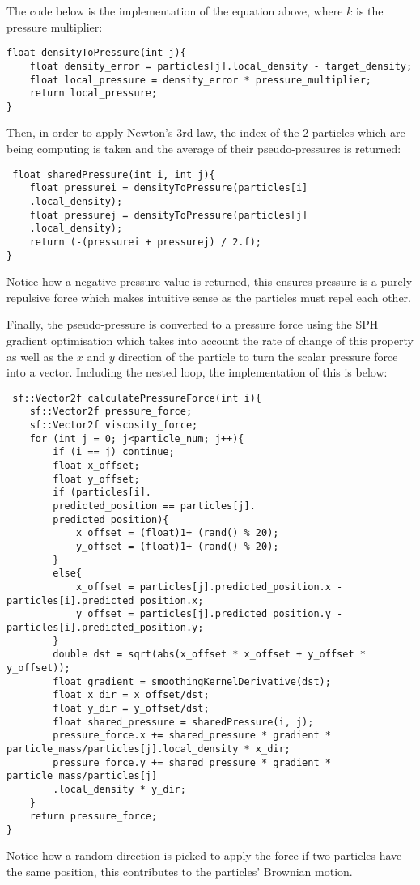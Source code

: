 \documentclass[write-up.tex]{subfiles}
\begin{document}
The code below is the implementation of the equation above, where $k$ is the pressure multiplier:
\begin{lstlisting}
float densityToPressure(int j){
    float density_error = particles[j].local_density - target_density;
    float local_pressure = density_error * pressure_multiplier;
    return local_pressure;
}
\end{lstlisting}

Then, in order to apply Newton's 3rd law, the index of the 2 particles which are being computing is taken and the average of their pseudo-pressures is returned:

\begin{lstlisting}
 float sharedPressure(int i, int j){
    float pressurei = densityToPressure(particles[i]
    .local_density);
    float pressurej = densityToPressure(particles[j]
    .local_density);
    return (-(pressurei + pressurej) / 2.f);
}
\end{lstlisting}
Notice how a negative pressure value is returned, this ensures pressure is a purely repulsive force which makes intuitive sense as the particles must repel each other.

Finally, the pseudo-pressure is converted to a pressure force using the SPH gradient optimisation which takes into account the rate of change of this property as well as the $x$ and $y$ direction of the particle to turn the scalar pressure force into a vector. Including the nested loop, the implementation of this is below:

\begin{lstlisting}
 sf::Vector2f calculatePressureForce(int i){
    sf::Vector2f pressure_force;
    sf::Vector2f viscosity_force;
    for (int j = 0; j<particle_num; j++){
        if (i == j) continue;
        float x_offset;
        float y_offset;
        if (particles[i].
        predicted_position == particles[j].
        predicted_position){
            x_offset = (float)1+ (rand() % 20);
            y_offset = (float)1+ (rand() % 20);
        }
        else{
            x_offset = particles[j].predicted_position.x - particles[i].predicted_position.x;
            y_offset = particles[j].predicted_position.y - particles[i].predicted_position.y;
        }
        double dst = sqrt(abs(x_offset * x_offset + y_offset * y_offset));
        float gradient = smoothingKernelDerivative(dst);
        float x_dir = x_offset/dst;
        float y_dir = y_offset/dst;
        float shared_pressure = sharedPressure(i, j);
        pressure_force.x += shared_pressure * gradient * particle_mass/particles[j].local_density * x_dir;
        pressure_force.y += shared_pressure * gradient * particle_mass/particles[j]
        .local_density * y_dir;
    }
    return pressure_force;
}
\end{lstlisting}
Notice how a random direction is picked to apply the force if two particles have the same position, this contributes to the particles' Brownian motion.
\end{document}
